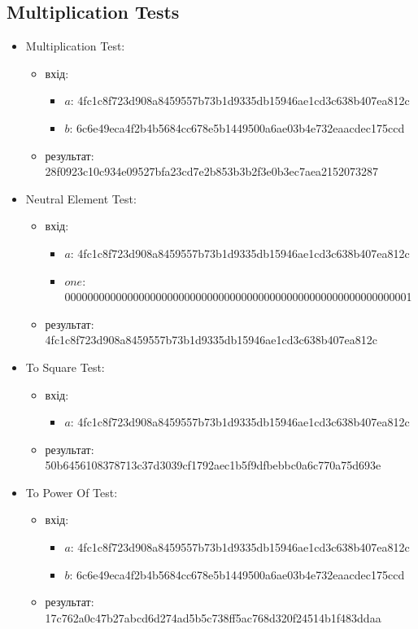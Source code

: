 \documentclass{article}
\begin{document}
\subsection{Multiplication Tests}
\begin{itemize}
    \item Multiplication Test:
        \begin{itemize}
            \item вхід: 
                \begin{itemize}
                    \item $a$: 4fc1c8f723d908a8459557b73b1d9335db15946ae1cd3c638b407ea812c
                    \item $b$: 6c6e49eca4f2b4b5684cc678e5b1449500a6ae03b4e732eaacdec175ccd
                \end{itemize}
            \item результат: 28f0923c10c934e09527bfa23cd7e2b853b3b2f3e0b3ec7aea2152073287
        \end{itemize}
    \item Neutral Element Test:
        \begin{itemize}
            \item вхід: 
                \begin{itemize}
                    \item $a$: 4fc1c8f723d908a8459557b73b1d9335db15946ae1cd3c638b407ea812c
                    \item $one$: 0000000000000000000000000000000000000000000000000000000000001
                \end{itemize}
            \item результат: 4fc1c8f723d908a8459557b73b1d9335db15946ae1cd3c638b407ea812c
        \end{itemize}
    \item To Square Test:
        \begin{itemize}
            \item вхід: 
                \begin{itemize}
                    \item $a$: 4fc1c8f723d908a8459557b73b1d9335db15946ae1cd3c638b407ea812c
                \end{itemize}
            \item результат: 50b6456108378713c37d3039cf1792aec1b5f9dfbebbc0a6c770a75d693e
        \end{itemize}
    \item To Power Of Test:
        \begin{itemize}
            \item вхід: 
                \begin{itemize}
                    \item $a$: 4fc1c8f723d908a8459557b73b1d9335db15946ae1cd3c638b407ea812c
                    \item $b$: 6c6e49eca4f2b4b5684cc678e5b1449500a6ae03b4e732eaacdec175ccd
                \end{itemize}
            \item результат: 17c762a0c47b27abcd6d274ad5b5c738ff5ac768d320f24514b1f483ddaa
        \end{itemize}
\end{itemize}
\end{document}
